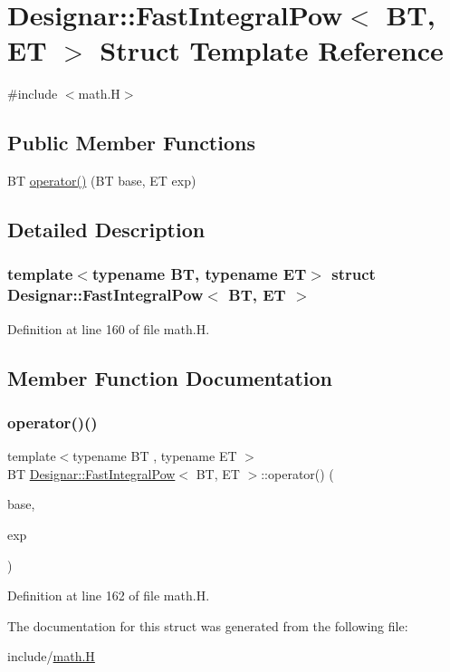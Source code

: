 \hypertarget{struct_designar_1_1_fast_integral_pow}{}\section{Designar\+:\+:Fast\+Integral\+Pow$<$ BT, ET $>$ Struct Template Reference}
\label{struct_designar_1_1_fast_integral_pow}


{\ttfamily \#include $<$math.\+H$>$}

\subsection*{Public Member Functions}
\begin{DoxyCompactItemize}
\item 
BT \hyperlink{struct_designar_1_1_fast_integral_pow_a0c78ecac21d1454b9bdae4620c3473db}{operator()} (BT base, ET exp)
\end{DoxyCompactItemize}


\subsection{Detailed Description}
\subsubsection*{template$<$typename BT, typename ET$>$\newline
struct Designar\+::\+Fast\+Integral\+Pow$<$ B\+T, E\+T $>$}



Definition at line 160 of file math.\+H.



\subsection{Member Function Documentation}
\mbox{\label{struct_designar_1_1_fast_integral_pow_a0c78ecac21d1454b9bdae4620c3473db}} 
\subsubsection{\texorpdfstring{operator()()}{operator()()}}
{\footnotesize\ttfamily template$<$typename BT , typename ET $>$ \\
BT \hyperlink{struct_designar_1_1_fast_integral_pow}{Designar\+::\+Fast\+Integral\+Pow}$<$ BT, ET $>$\+::operator() (\begin{DoxyParamCaption}\item[{BT}]{base,  }\item[{ET}]{exp }\end{DoxyParamCaption})\hspace{0.3cm}{\ttfamily [inline]}}



Definition at line 162 of file math.\+H.



The documentation for this struct was generated from the following file\+:\begin{DoxyCompactItemize}
\item 
include/\hyperlink{math_8_h}{math.\+H}\end{DoxyCompactItemize}
